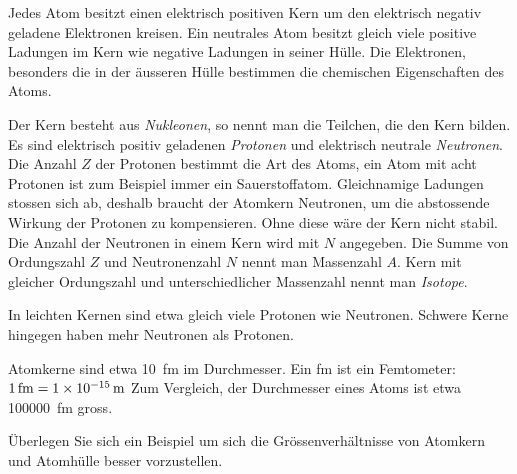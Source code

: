 \documentclass[12pt,a4paper,twoside]{article}
\begin{document}
\newpage



Jedes Atom besitzt einen elektrisch positiven Kern um den elektrisch negativ geladene Elektronen kreisen. Ein neutrales Atom besitzt gleich
viele positive Ladungen im Kern wie negative Ladungen in seiner Hülle.
Die Elektronen, besonders die in der äusseren Hülle bestimmen die chemischen Eigenschaften des Atoms.

Der Kern besteht aus \emph{Nukleonen}, so nennt man die Teilchen, die den Kern bilden. 
Es sind elektrisch positiv geladenen \emph{Protonen} und elektrisch neutrale \emph{Neutronen}.
Die Anzahl $Z$ der Protonen bestimmt die Art des Atoms, ein Atom mit acht Protonen ist zum Beispiel immer ein Sauerstoffatom.
Gleichnamige Ladungen stossen sich ab, deshalb braucht der Atomkern Neutronen, um die abstossende Wirkung der Protonen zu kompensieren.
Ohne diese wäre der Kern nicht stabil.
Die Anzahl der Neutronen in einem Kern wird mit $N$ angegeben.
Die Summe von Ordungszahl $Z$ und Neutronenzahl $N$ nennt man Massenzahl $A$.
Kern mit gleicher Ordungszahl und unterschiedlicher Massenzahl nennt man \emph{Isotope}.

In leichten Kernen sind etwa gleich viele Protonen wie Neutronen. 
Schwere Kerne hingegen haben mehr Neutronen als Protonen.


Atomkerne sind etwa \SI{10}{fm} im Durchmesser.
Ein fm ist ein Femtometer: $\SI{1}{fm} = \SI{1E-15}{m}$
Zum Vergleich, der Durchmesser eines Atoms ist etwa \SI{100000}{fm} gross.

\begin{aufgabe}
	Überlegen Sie sich ein Beispiel um sich die Grössenverhältnisse von Atomkern und Atomhülle besser vorzustellen.
\end{aufgabe}


%
\end{document}
